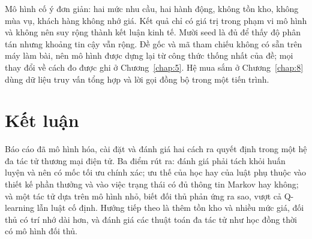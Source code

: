 Mô hình cố ý đơn giản: hai mức nhu cầu, hai hành động, không tồn kho, không mùa vụ, khách hàng không nhớ giá. Kết quả chỉ
có giá trị trong phạm vi mô hình và không nên suy rộng thành kết luận kinh tế. Mười seed là đủ để thấy độ phân tán nhưng
khoảng tin cậy vẫn rộng. Đề gốc và mã tham chiếu không có sẵn trên máy làm bài, nên mô hình được dựng lại từ công thức
thống nhất của đề; mọi thay đổi về cách đo được ghi ở Chương~\ref{chap:5}. Hệ mua sắm ở Chương~\ref{chap:8} dùng dữ liệu truy vấn
tổng hợp và lời gọi đồng bộ trong một tiến trình.

\section{Kết luận}

Báo cáo đã mô hình hóa, cài đặt và đánh giá hai cách ra quyết định trong một hệ đa tác tử thương mại điện tử. Ba điểm rút
ra: đánh giá phải tách khỏi huấn luyện và nên có mốc tối ưu chính xác; ưu thế của học hay của luật phụ thuộc vào thiết kế
phần thưởng và vào việc trạng thái có đủ thông tin Markov hay không; và một tác tử dựa trên mô hình nhỏ, biết đối thủ
phản ứng ra sao, vượt cả Q-learning lẫn luật cố định. Hướng tiếp theo là thêm tồn kho và nhiều mức giá, đối thủ có trí nhớ
dài hơn, và đánh giá các thuật toán đa tác tử như học đồng thời có mô hình đối thủ.
